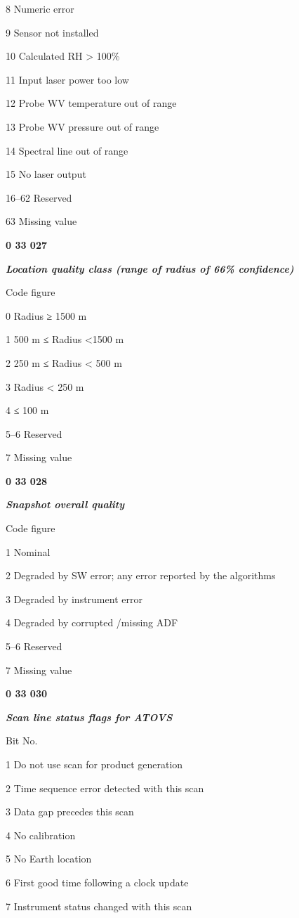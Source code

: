 8 Numeric error

9 Sensor not installed

10 Calculated RH \textgreater{} 100\%

11 Input laser power too low

12 Probe WV temperature out of range

13 Probe WV pressure out of range

14 Spectral line out of range

15 No laser output

16--62 Reserved

63 Missing value

\textbf{0 33 027}

\emph{\textbf{Location quality class (range of radius of 66\% confidence)}}

Code figure

0 Radius ≥ 1500 m

1 500 m ≤ Radius \textless1500 m

2 250 m ≤ Radius \textless{} 500 m

3 Radius \textless{} 250 m

4 ≤ 100 m

5--6 Reserved

7 Missing value

\textbf{0 33 028}

\emph{\textbf{Snapshot overall quality}}

Code figure

1 Nominal

2 Degraded by SW error; any error reported by the algorithms

3 Degraded by instrument error

4 Degraded by corrupted /missing ADF

5--6 Reserved

7 Missing value

\textbf{0 33 030}

\emph{\textbf{Scan line status flags for ATOVS}}

Bit No.

1 Do not use scan for product generation

2 Time sequence error detected with this scan

3 Data gap precedes this scan

4 No calibration

5 No Earth location

6 First good time following a clock update

7 Instrument status changed with this scan

